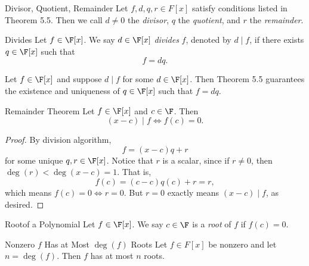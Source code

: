 \documentclass[linearalgebra]{subfiles}
\begin{document}
    \begin{definition}{Divisor, Quotient, Remainder}{}
        Let $f, d, q, r\in F[x]$ satisfy conditions listed in Theorem 5.5. Then we call $d\neq 0$ the \emph{divisor}, $q$ the \emph{quotient}, and $r$ the \emph{remainder}.
    \end{definition}

    \begin{definition}{Divides}{}
        Let $f\in \F[x]$. We say $d\in \F[x]$ \emph{divides} $f$, denoted by $d\mid f$, if there exists $q\in\F[x]$ such that
        \begin{equation*}
            f = dq.
        \end{equation*}
    \end{definition}

    \begin{remark}
        Let $f\in\F[x]$ and suppose $d\mid f$ for some $d\in\F[x]$. Then Theorem 5.5 guarantees the existence and uniqueness of $q\in\F[x]$ such that $f = dq$.
    \end{remark}

    \begin{cor}{Remainder Theorem}
        Let $f\in \F[x]$ and $c\in \F$. Then
        \begin{equation*}
            (x-c)\mid f \iff f(c) = 0.
        \end{equation*}
    \end{cor}

    \begin{proof}
        By division algorithm,
        \begin{equation*}
            f = (x-c)q + r
        \end{equation*}
        for some unique $q,r\in \F[x]$. Notice that $r$ is a scalar, since if $r\neq 0$, then $\deg(r)< \deg(x-c) = 1$. That is,
        \begin{equation*}
            f(c) = (c-c)q(c)+r = r,
        \end{equation*}
        which means $f(c) = 0 \iff r = 0$. But $r=0$ exactly means $(x-c)\mid f$, as desired.
    \end{proof}

    \begin{definition}{Root}{of a Polynomial}
        Let $f\in \F[x]$. We say $c\in \F$ is a \emph{root} of $f$ if $f(c) = 0$.
    \end{definition}

    \clearpage
    \begin{cor}{Nonzero $f$ Has at Most $\deg(f)$ Roots}
        Let $f\in F[x]$ be nonzero and let $n=\deg(f)$. Then $f$ has at most $n$ roots.
    \end{cor}
\end{document}
